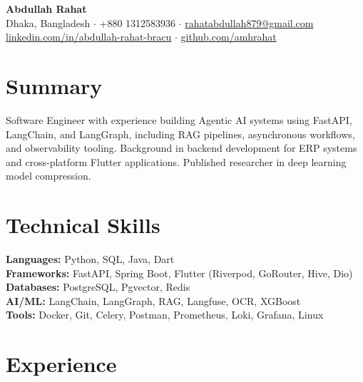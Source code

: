 \documentclass[11pt,a4paper]{article}
\begin{document}
\begin{center}
    {\LARGE \textbf{Abdullah Rahat}}\\[4pt]
    Dhaka, Bangladesh $\cdot$ +880 1312583936 $\cdot$ \href{mailto:rahatabdullah879@gmail.com}{rahatabdullah879@gmail.com}\\
    \href{https://www.linkedin.com/in/abdullah-rahat-bracu/}{linkedin.com/in/abdullah-rahat-bracu} $\cdot$ \href{https://github.com/amhrahat}{github.com/amhrahat}
\end{center}

\section*{Summary}
Software Engineer with experience building Agentic AI systems using FastAPI, LangChain, and LangGraph, including RAG pipelines, asynchronous workflows, and observability tooling. Background in backend development for ERP systems and cross-platform Flutter applications. Published researcher in deep learning model compression.

\section*{Technical Skills}
\textbf{Languages:} Python, SQL, Java, Dart \\
\textbf{Frameworks:} FastAPI, Spring Boot, Flutter (Riverpod, GoRouter, Hive, Dio) \\
\textbf{Databases:} PostgreSQL, Pgvector, Redis \\
\textbf{AI/ML:} LangChain, LangGraph, RAG, Langfuse, OCR, XGBoost \\
\textbf{Tools:} Docker, Git, Celery, Postman, Prometheus, Loki, Grafana, Linux

\section*{Experience}
\end{document}
